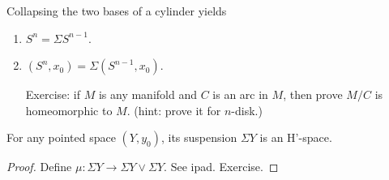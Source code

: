 \documentclass[12pt,class=article,crop=false]{standalone}
\begin{document}
\begin{eg}
Collapsing the two bases of a cylinder yields
\begin{enumerate}[label=(\arabic*)]
	\item $ S^{n} = \Sigma S^{n-1}$.
	\item $ (S^{n},x_0)= \Sigma (S^{n-1},x_0)$.

		Exercise: if $ M$ is any manifold and  $ C$ is an arc in  $ M$, then prove  $ M /C$ is homeomorphic to  $ M$. (hint: prove it for $ n$-disk.)
\end{enumerate}
\end{eg}

\begin{lem}
For any pointed space $ (Y,y_0)$, its suspension $ \Sigma Y$ is an  H'-space.
\end{lem}
\begin{proof}
Define $ \mu: \Sigma Y \to \Sigma Y \vee \Sigma Y$. See ipad. Exercise.
\end{proof}
\end{document}
